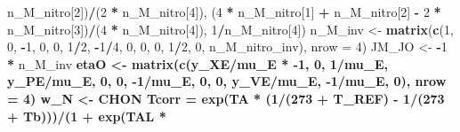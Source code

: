 \documentclass[]{article}
\newenvironment{Shaded}{\begin{snugshade}}{\end{snugshade}}
\newcommand{\KeywordTok}[1]{\textcolor[rgb]{0.13,0.29,0.53}{\textbf{#1}}}
\newcommand{\DataTypeTok}[1]{\textcolor[rgb]{0.13,0.29,0.53}{#1}}
\newcommand{\DecValTok}[1]{\textcolor[rgb]{0.00,0.00,0.81}{#1}}
\newcommand{\StringTok}[1]{\textcolor[rgb]{0.31,0.60,0.02}{#1}}
\newcommand{\OperatorTok}[1]{\textcolor[rgb]{0.81,0.36,0.00}{\textbf{#1}}}
\newcommand{\NormalTok}[1]{#1}
\begin{document}
\begin{Shaded}
\begin{Highlighting}[]
{\StringTok{        }\NormalTok{n_M_nitro[}\DecValTok{2}\NormalTok{])}\OperatorTok{/}\NormalTok{(}\DecValTok{2} \OperatorTok{*}\StringTok{ }\NormalTok{n_M_nitro[}\DecValTok{4}\NormalTok{]), (}\DecValTok{4} \OperatorTok{*}\StringTok{ }\NormalTok{n_M_nitro[}\DecValTok{1}\NormalTok{] }\OperatorTok{+}\StringTok{ }
\StringTok{        }\NormalTok{n_M_nitro[}\DecValTok{2}\NormalTok{] }\OperatorTok{-}\StringTok{ }\DecValTok{2} \OperatorTok{*}\StringTok{ }\NormalTok{n_M_nitro[}\DecValTok{3}\NormalTok{])}\OperatorTok{/}\NormalTok{(}\DecValTok{4} \OperatorTok{*}\StringTok{ }\NormalTok{n_M_nitro[}\DecValTok{4}\NormalTok{]), }
        \DecValTok{1}\OperatorTok{/}\NormalTok{n_M_nitro[}\DecValTok{4}\NormalTok{])}
\NormalTok{    n_M_inv <-}\StringTok{ }\KeywordTok{matrix}\NormalTok{(}\KeywordTok{c}\NormalTok{(}\DecValTok{1}\NormalTok{, }\DecValTok{0}\NormalTok{, }\OperatorTok{-}\DecValTok{1}\NormalTok{, }\DecValTok{0}\NormalTok{, }\DecValTok{0}\NormalTok{, }\DecValTok{1}\OperatorTok{/}\DecValTok{2}\NormalTok{, }\OperatorTok{-}\DecValTok{1}\OperatorTok{/}\DecValTok{4}\NormalTok{, }\DecValTok{0}\NormalTok{, }\DecValTok{0}\NormalTok{, }\DecValTok{0}\NormalTok{, }\DecValTok{1}\OperatorTok{/}\DecValTok{2}\NormalTok{, }
        \DecValTok{0}\NormalTok{, n_M_nitro_inv), }\DataTypeTok{nrow =} \DecValTok{4}\NormalTok{)}
\NormalTok{    JM_JO <-}\StringTok{ }\OperatorTok{-}\DecValTok{1} \OperatorTok{*}\StringTok{ }\NormalTok{n_M_inv }\OperatorTok{%*%}\StringTok{ }\NormalTok{n_O}
\NormalTok{    etaO <-}\StringTok{ }\KeywordTok{matrix}\NormalTok{(}\KeywordTok{c}\NormalTok{(y_XE}\OperatorTok{/}\NormalTok{mu_E }\OperatorTok{*}\StringTok{ }\OperatorTok{-}\DecValTok{1}\NormalTok{, }\DecValTok{0}\NormalTok{, }\DecValTok{1}\OperatorTok{/}\NormalTok{mu_E, y_PE}\OperatorTok{/}\NormalTok{mu_E, }\DecValTok{0}\NormalTok{, }
        \DecValTok{0}\NormalTok{, }\OperatorTok{-}\DecValTok{1}\OperatorTok{/}\NormalTok{mu_E, }\DecValTok{0}\NormalTok{, }\DecValTok{0}\NormalTok{, y_VE}\OperatorTok{/}\NormalTok{mu_E, }\OperatorTok{-}\DecValTok{1}\OperatorTok{/}\NormalTok{mu_E, }\DecValTok{0}\NormalTok{), }\DataTypeTok{nrow =} \DecValTok{4}\NormalTok{)}
\NormalTok{    w_N <-}\StringTok{ }\NormalTok{CHON }\OperatorTok{%*%}\StringTok{ }\NormalTok{n_M_nitro}
\NormalTok{    Tcorr =}\StringTok{ }\KeywordTok{exp}\NormalTok{(TA }\OperatorTok{*}\StringTok{ }\NormalTok{(}\DecValTok{1}\OperatorTok{/}\NormalTok{(}\DecValTok{273} \OperatorTok{+}\StringTok{ }\NormalTok{T_REF) }\OperatorTok{-}\StringTok{ }\DecValTok{1}\OperatorTok{/}\NormalTok{(}\DecValTok{273} \OperatorTok{+}\StringTok{ }\NormalTok{Tb)))}\OperatorTok{/}\NormalTok{(}\DecValTok{1} \OperatorTok{+}\StringTok{ }\KeywordTok{exp}\NormalTok{(TAL }\OperatorTok{*}\StringTok{ }
}}}
\end{Highlighting}
\end{Shaded}
\end{document}
